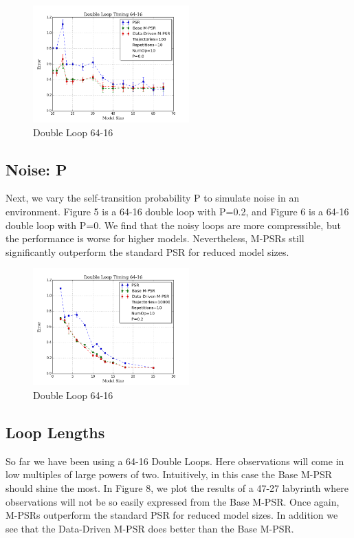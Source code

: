 \begin{figure}[ht!]
\centering
\includegraphics[width=60mm]{uCOREPICS/DL/64-16-100.png}
\caption{Double Loop 64-16\label{overflow}}
\end{figure}

\subsection{Noise: P}

Next, we vary the self-transition probability P to simulate noise in an environment. Figure 5 is a 64-16 double loop with P=0.2, and Figure 6 is a 64-16 double loop with P=0. We find that the noisy loops are more compressible, but the performance is worse for higher models. Nevertheless, M-PSRs still significantly outperform the standard PSR for reduced model sizes.

\begin{figure}[ht!]
\centering
\includegraphics[width=60mm]{uCOREPICS/DL/NoiseInfo.png}
\caption{Double Loop 64-16\label{overflow}}
\end{figure}

\subsection{Loop Lengths}

So far we have been using a 64-16 Double Loops. Here observations will come in low multiples of large powers of two. Intuitively, in this case the Base M-PSR should shine the most. In Figure 8, we plot the results of a 47-27 labyrinth where observations will not be so easily expressed from the Base M-PSR. Once again, M-PSRs outperform the standard PSR for reduced model sizes. In addition we see that the Data-Driven M-PSR does better than the Base M-PSR.

